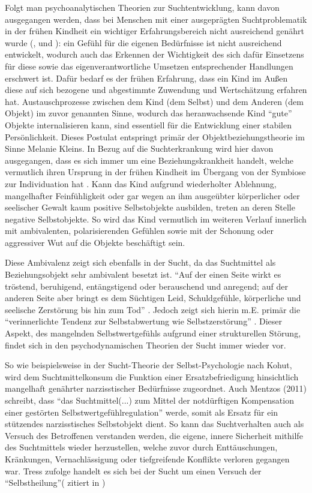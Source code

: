 Folgt man psychoanalytischen Theorien zur Suchtentwicklung, kann davon ausgegangen werden, dass bei Menschen mit einer ausgeprägten Suchtproblematik in der frühen Kindheit ein wichtiger Erfahrungsbereich nicht ausreichend genährt wurde (\cite{mentzos2011}, \cite{weidlinger2012} und \cite{ermann1999}): ein Gefühl für die eigenen Bedürfnisse ist nicht ausreichend entwickelt, wodurch auch das Erkennen der Wichtigkeit des sich dafür Einsetzens für diese sowie das eigenverantwortliche Umsetzen entsprechender Handlungen erschwert ist. Dafür bedarf es der frühen Erfahrung, dass ein Kind im Außen diese auf sich bezogene und abgestimmte Zuwendung und Wertschätzung erfahren hat. Austauschprozesse zwischen dem Kind (dem Selbst) und dem Anderen (dem Objekt) im zuvor genannten Sinne, wodurch das heranwachsende Kind "`gute"' Objekte internalisieren kann, sind essentiell für die Entwicklung einer stabilen Persönlichkeit. Dieses Postulat entspringt primär der Objektbeziehungstheorie im Sinne Melanie Kleins. In Bezug auf die Suchterkrankung wird hier davon ausgegangen, dass es sich immer um eine Beziehungskrankheit handelt, welche vermutlich ihren Ursprung in der frühen Kindheit im Übergang von der Symbiose zur Individuation hat \autocite[vgl.][9]{weidlinger2012}. Kann das Kind aufgrund wiederholter Ablehnung, mangelhafter Feinfühligkeit oder gar wegen an ihm ausgeübter körperlicher oder seelischer Gewalt kaum positive Selbstobjekte ausbilden, treten an deren Stelle negative Selbstobjekte. So wird das Kind vermutlich im weiteren Verlauf innerlich mit ambivalenten, polarisierenden Gefühlen sowie mit der Schonung oder aggressiver Wut auf die Objekte beschäftigt sein\autocite[vgl.][10]{weidlinger2012}. 

Diese Ambivalenz zeigt sich ebenfalls in der Sucht, da das Suchtmittel als Beziehungsobjekt sehr ambivalent besetzt ist. "`Auf der einen Seite wirkt es tröstend, beruhigend, entängstigend oder berauschend und anregend; auf der anderen Seite aber bringt es dem Süchtigen Leid, Schuldgefühle, körperliche und seelische Zerstörung bis hin zum Tod"' \autocite[175]{mentzos2011}. Jedoch zeigt sich hierin m.E. primär die "`verinnerlichte Tendenz zur Selbstabwertung wie Selbstzerstörung"' \autocite[10]{weidlinger2012}. Dieser Aspekt, des mangelnden Selbstwertgefühls aufgrund einer strukturellen Störung, findet sich in den psychodynamischen Theorien der Sucht immer wieder vor. 

So wie beispielsweise in der Sucht-Theorie der Selbst-Psychologie nach Kohut, wird dem Suchtmittelkonsum die Funktion einer Ersatzbefriedigung hinsichtlich mangelhaft genährter narzisstischer Bedürfnisse zugeordnet. Auch Mentzos (2011) schreibt, dass "`das Suchtmittel(...) zum Mittel der notdürftigen Kompensation einer gestörten Selbstwertgefühlregulation"' werde, somit als Ersatz für ein stützendes narzisstisches Selbstobjekt dient. So kann das Suchtverhalten auch als Versuch des Betroffenen verstanden werden, die eigene, innere Sicherheit mithilfe des Suchtmittels wieder herzustellen, welche zuvor durch Enttäuschungen, Kränkungen, Vernachlässigung oder tiefgreifende Konflikte verloren gegangen war. Tress zufolge handelt es sich bei der Sucht um einen Versuch der "`Selbstheilung"'(\cite{tress1985} zitiert in \cite[222]{ermann1999})

